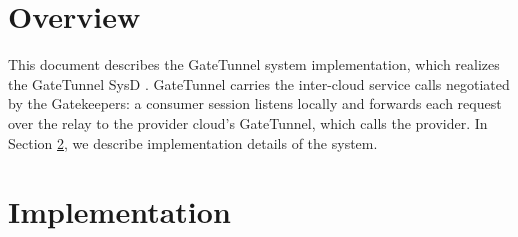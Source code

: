 \documentclass[a4paper]{arrowhead}
\begin{document}
\sloppy

\ArrowheadSetup

\begin{center}
  \vspace*{1cm}
  \huge{\arrowtitle}

  \vspace*{0.2cm}
  \LARGE{\arrowtype}
  \vspace*{1cm}

  \vspace*{\fill}


  \vspace*{1cm}
  \vspace*{\fill}

  \begin{abstract}
    This document describes the design and implementation of the GateTunnel support system of Arrowhead 5.2.2 (\texttt{ah5-GateTunnel-java-spring}).
  \end{abstract}

  \vspace*{1cm}
\end{center}

\newpage

\tableofcontents
\newpage

\section{Overview}
\label{sec:overview}

This document describes the GateTunnel system implementation, which realizes the GateTunnel SysD \cite{gt-sysd}. GateTunnel carries the inter-cloud service calls negotiated by the Gatekeepers: a consumer session listens locally and forwards each request over the relay to the provider cloud's GateTunnel, which calls the provider.
In Section \ref{Implementation}, we describe implementation details of the system.

\newpage

\section{Implementation}
\label{Implementation}
\end{document}
